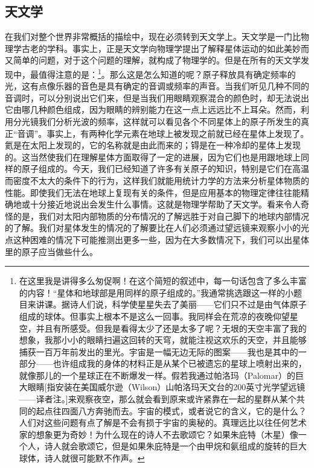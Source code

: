 \documentclass[12pt,oneside]{book}
\begin{document}
\begin{common-format}
\section{天文学}
在我们对整个世界非常概括的描绘中，现在必须转到天文学上。天文学是一门比物理学古老的学科。事实上，正是天文学向物理学提出了解释星体运动的如此美妙而又简单的问题，对于这个问题的理解，就构成了物理学的。但是在所有的天文学发现中，最值得注意的是：\footnote{在这里我是讲得多么匆促啊！在这个简短的叙述中，每一句话包含了多么丰富的内容！“星体和地球部是用同样的原子组成的。”我通常挑选跟这一样的小题目来讲课。据诗人们说，科学使星星失去了美丽——它们只不过是由气体原子组成的球体。但事实上根本不是这么一回事。我同样会在荒凉的夜晚仰望星空，并且有所感受。但我是看得太少了还是太多了呢？无垠的天空丰富了我的想象，我那小小的眼睛扫遍这回转的天穹，就能注视这欢乐的天空，并且能够捕获一百万年前发出的里光。宇宙是一幅无边无际的图案——我也是其中的一部分——也许组成我的身体的材料正是从某个已被遗忘的星球上喷射出来的，就像那儿的一个星球正在不断爆发一样。假若我通过帕洛玛（Palomar）的巨大眼睛[指安装在美国威尔逊（Wilson）山帕洛玛天文台的200英寸光学望远镜——译者注。]来观察夜空，那么就会看到原来或许紧靠在一起的星群从某个共同的起点往四面八方奔驰而去。宇宙的模式，或者说它的含义，它的是什么？人们对这些问题有点了解是不会有损于宇宙的奥秘的。真理远比以往任何艺术家的想象更为奇妙！为什么现在的诗人不去歌颂它？如果朱庇特（木星）像一个人，诗人就会歌颂它，但是如果朱庇特是一个由甲烷和氨组成的旋转的巨大球体，诗人就很可能默不作声。}。那么这是怎么知道的呢？原子释放具有确定频率的光，这有点像乐器的音色是具有确定的音调或频率的声音。当我们听见几种不同的音调时，可以分别说出它们来，但是当我们用眼睛观察混合的颜色时，却无法说出它由哪几种颜色组成，因为眼睛的辨别能力在这一点上远远比不上耳朵。然而，利用分光镜我们分析光波的频率，这样就可以看见各个不同星体上的原子所发生的真正“音调”。事实上，有两种化学元素在地球上被发现之前就已经在星体上发现了。氦是在太阳上发现的，它的名称就是由此而来的；锝是在一种冷却的星体上发现的。这当然使我们在理解星体方面取得了一定的进展，因为它们也是用跟地球上同样的原子组成的。今天，我们已经知道了许多有关原子的知识，特别是它们在高温而密度不太大的条件下的行为，这样我们就能用统计力学的方法来分析星体物质的性能。即使我们无法在地球上复现有关的条件，但是应用基本的物理定律往往能精确地或十分接近地说出会发生什么事情。这就是物理学帮助了天文学。看来令人奇怪的是，我们对太阳内部物质的分布情况的了解远胜于对自己脚下的地球内部情况的了解。我们对星体发生的情况的了解要比在人们必须通过望远镜来观察小小的光点这种困难的情况下可能推测出更多一些，因为在大多数情况下，我们可以出星体里的原子应当做些什么。


\end{common-format}
\end{document}
